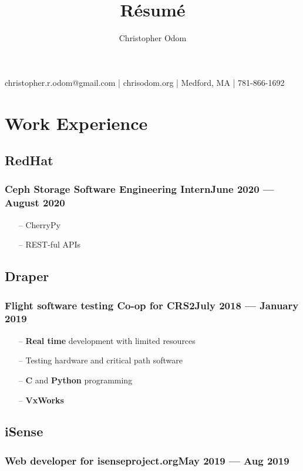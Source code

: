 \documentclass[11pt]{article}
\makeatletter
\renewcommand{\maketitle}
{
	\begin{center}\Huge \theauthor\end{center}
	{
		\begin{center}
			\large\noindent christopher.r.odom@gmail.com | chrisodom.org | Medford, MA | 781-866-1692
		\end{center}
	}
}
\makeatother
\begin{document}
\setlength\multicolsep{0pt}



\title{R\'esum\'e}
\author{Christopher Odom}

\maketitle

\section{Work Experience}

\subsection{\bfseries RedHat}
\subsubsection{Ceph Storage Software Engineering Intern\dotfill June 2020 --- August 2020}
\begin{itemize}[noitemsep, topsep=0pt]
	\item[--] CherryPy
	\item[--] REST-ful APIs
\end{itemize}
\noindent

\subsection{\bfseries Draper}
\subsubsection{Flight software testing Co-op for CRS2\dotfill July 2018 --- January 2019}
\begin{itemize}[noitemsep, topsep=0pt]
	\item[--] {\bf Real time} development with limited resources
	\item[--] Testing hardware and critical path software
	\item[--] {\bf C} and {\bf Python} programming
	\item[--] {\bf VxWorks}
\end{itemize}

\subsection{\bfseries iSense}
\subsubsection{Web developer for isenseproject.org\dotfill May 2019 --- Aug 2019}
\end{document}
